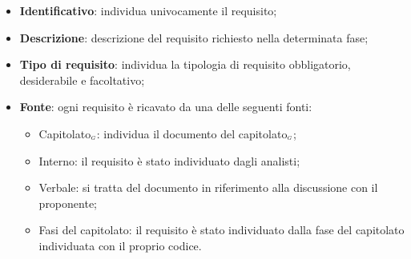 \begin{itemize}
	\item \textbf{Identificativo}: individua univocamente il requisito;
	\item \textbf{Descrizione}: descrizione del requisito richiesto nella determinata fase;
	\item \textbf{Tipo di requisito}: individua la tipologia di requisito obbligatorio, desiderabile e facoltativo;
	\item \textbf{Fonte}: ogni requisito è ricavato da una delle seguenti fonti:
	\begin{itemize}
		\item Capitolato$_{\scaleto{G}{3pt}}$: individua il documento del capitolato$_{\scaleto{G}{3pt}}$;
		\item Interno: il requisito è stato individuato dagli analisti;
		\item Verbale: si tratta del documento in riferimento alla discussione con il proponente;
		\item Fasi del capitolato: il requisito è stato individuato dalla fase del capitolato individuata con il proprio codice.
	\end{itemize}
\end{itemize}

